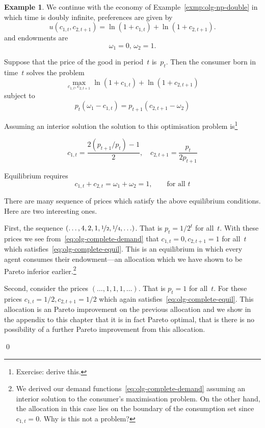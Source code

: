 \documentclass[11pt,reqno,openany]{amsbook}
\theoremstyle{plain}
\theoremstyle{definition}
\newtheorem{exmp}{Example}[chapter]
\begin{document}
\begin{exmp}\label{exmp:olg-complete}
We continue with the economy of Example~\ref{exmp:olg-np-double} in
which time is doubly infinite, preferences are given by
\[u(c_{1,t},c_{2,t+1})=\ln(1+c_{1,t})+\ln(1+c_{2,t+1}).\]
and endowments are
\[\omega_1=0,\, \omega_2=1.\]

Suppose that the price of the good in period~$t$ is~$p_t$. Then the
consumer born in time~$t$ solves the problem
\[\max_{c_{1,t},c_{2,t+1}} \ln(1+c_{1,t})+\ln(1+c_{2,t+1})\]
subject to
\[p_t(\omega_1-c_{1,t})=p_{t+1}(c_{2,t+1}-\omega_2)\]

Assuming an interior solution the solution to this optimisation
problem is\footnote{Exercise: derive this.}

\begin{equation}\label{eq:olg-complete-demand}
c_{1,t}=\frac{2(p_{t+1}/p_t)-1}{2},\quad
c_{2,t+1}=\frac{p_t}{2p_{t+1}}
\end{equation}

Equilibrium requires
\begin{equation}\label{eq:olg-complete-equil}
c_{1,t}+c_{2,t}=\omega_1+\omega_2=1,\qquad \text{for all $t$}
\end{equation}

There are many sequence of prices which satisfy the above equilibrium
conditions. Here are two interesting ones.

First, the sequence $(\ldots,4,2,1,\nicefrac{1}{2},\nicefrac{1}{4},\ldots)$. That is
$p_t=1/2^t$ for all~$t$. With these prices we see
from~\eqref{eq:olg-complete-demand} that $c_{1,t}=0, c_{2,t+1}=1$ for
all~$t$ which satisfies~\eqref{eq:olg-complete-equil}. This is an
equilibrium in which every agent consumes their endowment---an
allocation which we have shown to be Pareto inferior
earlier.\footnote{We derived our demand
  functions~\eqref{eq:olg-complete-demand} assuming an interior
  solution to the consumer's maximisation problem. On the other hand,
  the allocation in this case lies on the boundary of the consumption
  set since $c_{1,t}=0$. Why is this not a problem?}

Second, consider the prices $(\ldots,1,1,1,\ldots)$. That is $p_t=1$
for all~$t$. For these prices $c_{1,t}=1/2, c_{2,t+1}=1/2$ which again
satisfies~\eqref{eq:olg-complete-equil}. This allocation is an Pareto
improvement on the previous allocation and we show in the appendix to
this chapter that it is in fact Pareto optimal, that is there is no
possibility of a further Pareto improvement from this allocation.

\qed
\end{exmp}
\end{document}
